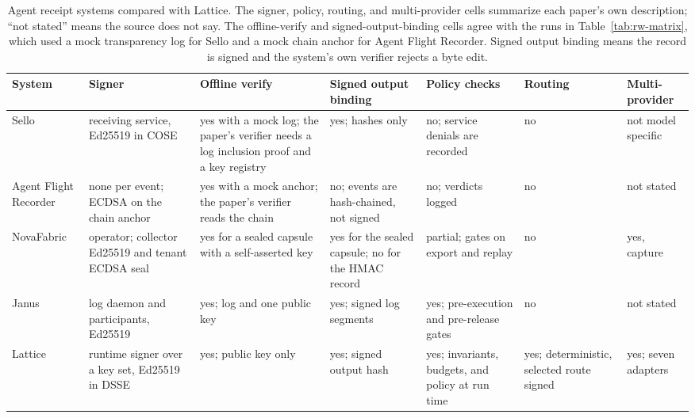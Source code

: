 \documentclass[conference]{IEEEtran}
\begin{document}
\begin{table}[t]
\caption{Agent receipt systems compared with Lattice. The signer, policy, routing, and
multi-provider cells summarize each paper's own description; ``not stated'' means the
source does not say. The offline-verify and signed-output-binding cells agree with the
runs in Table~\ref{tab:rw-matrix}, which used a mock transparency log for Sello and a mock
chain anchor for Agent Flight Recorder. Signed output binding means the record is signed
and the system's own verifier rejects a byte edit.}
\label{tab:receipts}
\centering
\footnotesize
\setlength{\tabcolsep}{4pt}
\begin{tabular}{@{}>{\raggedright\arraybackslash}p{19mm}>{\raggedright\arraybackslash}p{28mm}>{\raggedright\arraybackslash}p{32mm}>{\raggedright\arraybackslash}p{24mm}>{\raggedright\arraybackslash}p{28mm}>{\raggedright\arraybackslash}p{15mm}>{\raggedright\arraybackslash}p{16mm}@{}}
\toprule
System & Signer & Offline verify & Signed output binding & Policy checks & Routing & Multi-provider \\
\midrule
Sello \cite{figuera2026notarized} & receiving service, Ed25519 in COSE & yes with a mock log; the paper's verifier needs a log inclusion proof and a key registry & yes; hashes only & no; service denials are recorded & no & not model specific \\
Agent Flight Recorder \cite{bindschaedler2026afr} & none per event; ECDSA on the chain anchor & yes with a mock anchor; the paper's verifier reads the chain & no; events are hash-chained, not signed & no; verdicts logged & no & not stated \\
NovaFabric \cite{ardebili2026novafabric} & operator; collector Ed25519 and tenant ECDSA seal & yes for a sealed capsule with a self-asserted key & yes for the sealed capsule; no for the HMAC record & partial; gates on export and replay & no & yes, capture \\
Janus \cite{arslan2026janus} & log daemon and participants, Ed25519 & yes; log and one public key & yes; signed log segments & yes; pre-execution and pre-release gates & no & not stated \\
Lattice & runtime signer over a key set, Ed25519 in DSSE & yes; public key only & yes; signed output hash & yes; invariants, budgets, and policy at run time & yes; deterministic, selected route signed & yes; seven adapters \\
\bottomrule
\end{tabular}
\end{table}
\end{document}
